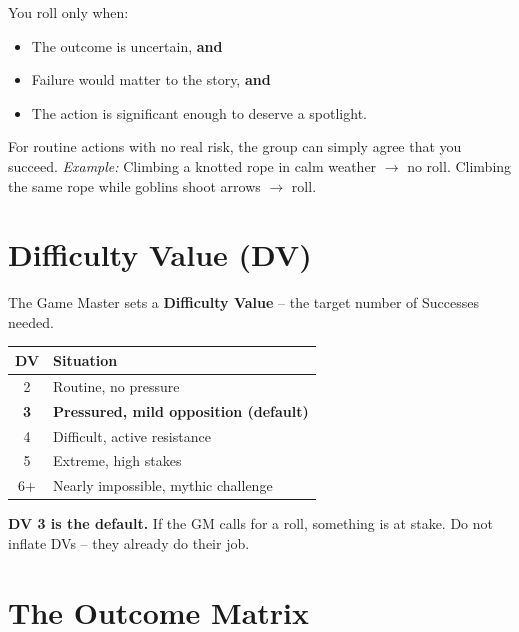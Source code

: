 \begin{tcolorbox}[colback=purple!5!white,colframe=purple!75!black,title=\textbf{When to Roll},breakable]
  You roll only when:
  \begin{itemize}
    \item The outcome is uncertain, \textbf{and}
    \item Failure would matter to the story, \textbf{and}
    \item The action is significant enough to deserve a spotlight.
  \end{itemize}
  For routine actions with no real risk, the group can simply agree that you succeed.  
  \textit{Example:} Climbing a knotted rope in calm weather $\rightarrow$ no roll.  
  Climbing the same rope while goblins shoot arrows $\rightarrow$ roll.
\end{tcolorbox}

\section{Difficulty Value (DV)}
\label{sec:difficulty-value}

The Game Master sets a \textbf{Difficulty Value} -- the target number of Successes needed.

\begin{tcolorbox}[colback=gray!5!white,colframe=gray!70!black,title=\textbf{Difficulty Value (DV) Ladder},breakable]
\begin{center}
\begin{tabular}{cl}
\toprule
\textbf{DV} & \textbf{Situation} \\
\midrule
2 & Routine, no pressure \\
\textbf{3} & \textbf{Pressured, mild opposition (default)} \\
4 & Difficult, active resistance \\
5 & Extreme, high stakes \\
6+ & Nearly impossible, mythic challenge \\
\bottomrule
\end{tabular}
\end{center}
\end{tcolorbox}

\noindent \textbf{DV 3 is the default.} If the GM calls for a roll, something is at stake. Do not inflate DVs -- they already do their job.

\section{The Outcome Matrix}
\label{sec:outcome-matrix}

